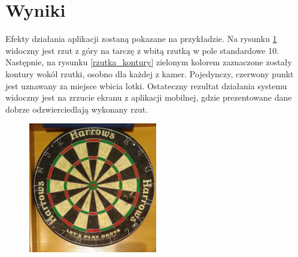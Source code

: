 \section{Wyniki}
Efekty działania aplikacji zostaną pokazane na przykładzie. Na rysunku \ref{rzutka_gora} widoczny jest rzut z góry na tarczę z wbitą rzutką w pole standardowe 10. Następnie, na rysunku \ref{rzutka_kontury} zielonym kolorem zaznaczone zostały kontury wokół rzutki, osobno dla każdej z kamer. Pojedynczy, czerwony punkt jest uznawany za miejsce wbicia lotki. Ostateczny rezultat działania systemu widoczny jest na zrzucie ekranu z aplikacji mobilnej, gdzie prezentowane dane dobrze odzwierciedlają wykonany rzut.
\begin{figure}[h!]
\begin{center}
\includegraphics[width=0.5\textwidth]{obrazki/rzutka_gora.jpg}
\end{center}
\label{rzutka_gora}
\end{figure} 


